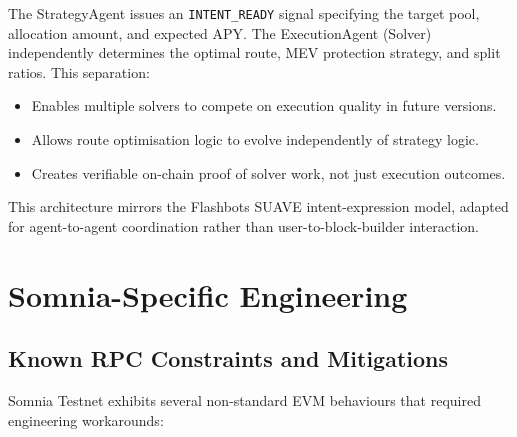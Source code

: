 \documentclass[11pt,a4paper]{article}
\begin{document}
The StrategyAgent issues an \texttt{INTENT\_READY} signal specifying the target pool,
allocation amount, and expected APY. The ExecutionAgent (Solver) independently determines the
optimal route, MEV protection strategy, and split ratios. This separation:

\begin{itemize}[leftmargin=1.8em]
  \item Enables multiple solvers to compete on execution quality in future versions.
  \item Allows route optimisation logic to evolve independently of strategy logic.
  \item Creates verifiable on-chain proof of solver work, not just execution outcomes.
\end{itemize}

This architecture mirrors the Flashbots SUAVE intent-expression model, adapted for
agent-to-agent coordination rather than user-to-block-builder interaction.

\section{Somnia-Specific Engineering}

\subsection{Known RPC Constraints and Mitigations}

Somnia Testnet exhibits several non-standard EVM behaviours that required engineering
workarounds:
\end{document}

